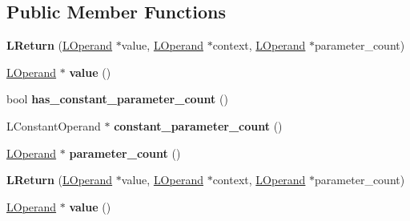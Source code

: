 \subsection*{Public Member Functions}
\begin{DoxyCompactItemize}
\item 
{\bfseries L\+Return} (\hyperlink{classv8_1_1internal_1_1_l_operand}{L\+Operand} $\ast$value, \hyperlink{classv8_1_1internal_1_1_l_operand}{L\+Operand} $\ast$context, \hyperlink{classv8_1_1internal_1_1_l_operand}{L\+Operand} $\ast$parameter\+\_\+count)\hypertarget{classv8_1_1internal_1_1_l_return_af69be24dc79385d85a6b221138258d67}{}\label{classv8_1_1internal_1_1_l_return_af69be24dc79385d85a6b221138258d67}

\item 
\hyperlink{classv8_1_1internal_1_1_l_operand}{L\+Operand} $\ast$ {\bfseries value} ()\hypertarget{classv8_1_1internal_1_1_l_return_a846c6b559bdc3e68ab7de2472718eff0}{}\label{classv8_1_1internal_1_1_l_return_a846c6b559bdc3e68ab7de2472718eff0}

\item 
bool {\bfseries has\+\_\+constant\+\_\+parameter\+\_\+count} ()\hypertarget{classv8_1_1internal_1_1_l_return_a263e1bd29a12702e4c5fc6214fbe4ca5}{}\label{classv8_1_1internal_1_1_l_return_a263e1bd29a12702e4c5fc6214fbe4ca5}

\item 
L\+Constant\+Operand $\ast$ {\bfseries constant\+\_\+parameter\+\_\+count} ()\hypertarget{classv8_1_1internal_1_1_l_return_a0453fde1ccafc982160182465d2f2e4a}{}\label{classv8_1_1internal_1_1_l_return_a0453fde1ccafc982160182465d2f2e4a}

\item 
\hyperlink{classv8_1_1internal_1_1_l_operand}{L\+Operand} $\ast$ {\bfseries parameter\+\_\+count} ()\hypertarget{classv8_1_1internal_1_1_l_return_ad644e156a714136b62e763b8239f04fc}{}\label{classv8_1_1internal_1_1_l_return_ad644e156a714136b62e763b8239f04fc}

\item 
{\bfseries L\+Return} (\hyperlink{classv8_1_1internal_1_1_l_operand}{L\+Operand} $\ast$value, \hyperlink{classv8_1_1internal_1_1_l_operand}{L\+Operand} $\ast$context, \hyperlink{classv8_1_1internal_1_1_l_operand}{L\+Operand} $\ast$parameter\+\_\+count)\hypertarget{classv8_1_1internal_1_1_l_return_af69be24dc79385d85a6b221138258d67}{}\label{classv8_1_1internal_1_1_l_return_af69be24dc79385d85a6b221138258d67}

\item 
\hyperlink{classv8_1_1internal_1_1_l_operand}{L\+Operand} $\ast$ {\bfseries value} ()\hypertarget{classv8_1_1internal_1_1_l_return_a846c6b559bdc3e68ab7de2472718eff0}{}\label{classv8_1_1internal_1_1_l_return_a846c6b559bdc3e68ab7de2472718eff0}


\end{DoxyCompactItemize}
